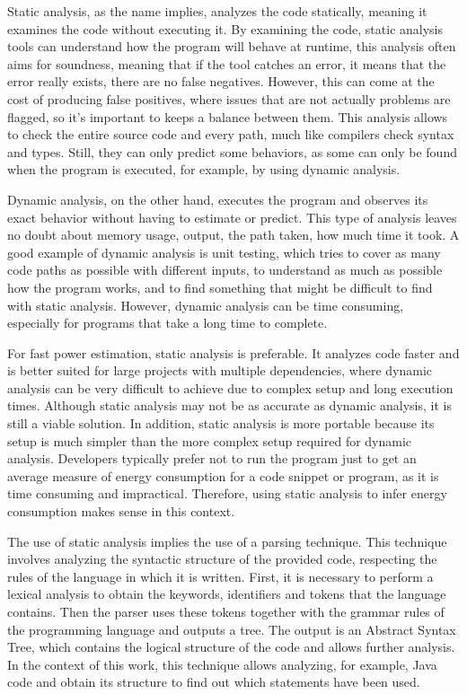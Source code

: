 \documentclass[sigplan]{acmart}
\begin{document}
Static analysis, as the name implies, analyzes the code statically, meaning it examines the code without executing it. By examining the code, static analysis tools can understand how the program will behave at runtime\cite{ernst2003static}, this analysis often aims for soundness, meaning that if the tool catches an error, it means that the error really exists, there are no false negatives. However, this can come at the cost of producing false positives, where issues that are not actually problems are flagged, so it's important to keeps a balance between them. This analysis allows to check the entire source code and every path, much like compilers check syntax and types. Still, they can only predict some behaviors, as some can only be found when the program is executed, for example, by using dynamic analysis.

Dynamic analysis, on the other hand, executes the program and observes its exact behavior without having to estimate or predict. This type of analysis leaves no doubt about memory usage, output, the path taken, how much time it took\cite{ernst2003static}. A good example of dynamic analysis is unit testing, which tries to cover as many code paths as possible with different inputs, to understand as much as possible how the program works, and to find something that might be difficult to find with static analysis. However, dynamic analysis can be time consuming, especially for programs that take a long time to complete.

For fast power estimation, static analysis is preferable. It analyzes code faster and is better suited for large projects with multiple dependencies, where dynamic analysis can be very difficult to achieve due to complex setup and long execution times. Although static analysis may not be as accurate as dynamic analysis, it is still a viable solution. In addition, static analysis is more portable because its setup is much simpler than the more complex setup required for dynamic analysis.
Developers typically prefer not to run the program just to get an average measure of energy consumption for a code snippet or program, as it is time consuming and impractical. Therefore, using static analysis to infer energy consumption makes sense in this context.

The use of static analysis implies the use of a parsing technique. This technique involves analyzing the syntactic structure of the provided code, respecting the rules of the language in which it is written. First, it is necessary to perform a lexical analysis to obtain the keywords, identifiers and tokens that the language contains. Then the parser uses these tokens together with the grammar rules of the programming language and outputs a tree. The output is an Abstract Syntax Tree, which contains the logical structure of the code and allows further analysis. In the context of this work, this technique allows analyzing, for example, Java code and obtain its structure to find out which statements have been used.
\end{document}
